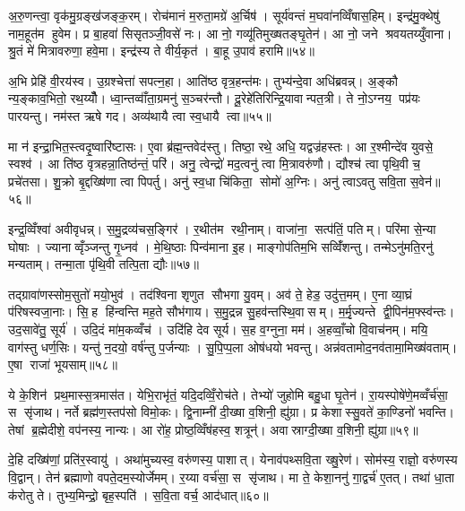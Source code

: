 अ॒रु॒णन्त्वा॒ वृक॑मु॒ग्रङ्ख॑जङ्क॒रम्। रोच॑मानं म॒रुता॒मग्रे॑ अ॒र्चिष॑। सूर्य॑वन्तं म॒घवा॑नव्विँषास॒हिम्। इन्द्र॑मु॒क्थेषु॑ नाम॒हूत॑म हुवेम। प्र बा॒हवा॑ सिसृतञ्जी॒वसे॑ नः। आ नो॒ गव्यू॑तिमुख्षतङ्घृ॒तेन॑। आ नो॒ जने श्रवयतय्युँवाना। श्रु॒तं मे॑ मित्रावरुणा॒ हवे॒मा। इन्द्र॑स्य ते वीर्य॒कृत॑। बा॒हू उ॒पाव॑ हरामि॥५४॥\anuvakamend[ब॒भू॒वाव्य॑य॒त्तेने॒मम॑ग्न इ॒ह वर्च॑सा॒ सम॑ङ्ग्धि॒ वैया॒घ्रेऽधि॑ राष्ट्र॒वर्ध॑न॒पाङ्क्ते॑न॒ छन्द॑सो॒पाव॑हरामि]

अ॒भि प्रेहि॑ वी॒रय॑स्व। उ॒ग्रश्चेत्ता॑ सपत्न॒हा। आति॑ष्ठ वृत्र॒हन्त॑मः। तुभ्य॑न्दे॒वा अधि॑ब्रवन्न्। अ॒ङ्कौ न्य॒ङ्काव॒भितो॒ रथ॒य्यौँ। ध्वा॒न्तव्वाँ॑ता॒ग्रमनु॑ स॒ञ्चर॑न्तौ। दू॒रेहे॑तिरिन्द्रि॒यावान्पत॒त्री। ते नो॒ऽग्नय॒ पप्र॑यः पारयन्तु। नम॑स्त ऋषे गद। अव्य॑थायै त्वा स्व॒धायै त्वा॥५५॥

मा न॑ इन्द्रा॒भित॒स्त्वदृ॒ष्वारि॑ष्टासः। ए॒वा ब्र॑ह्म॒न्तवेद॑स्तु। तिष्ठा॒ रथे॒ अधि॒ यद्वज्र॑हस्तः। आ र॒श्मीन्दे॑व युवसे॒ स्वश्व॑। आ ति॑ष्ठ वृत्रहन्ना॒तिष्ठ॑न्तं॒ परि॑। अनु॒ त्वेन्द्रो॑ मद॒त्वनु॑ त्वा मि॒त्रावरु॑णौ। द्यौश्च॑ त्वा पृथि॒वी च॒ प्रचे॑तसा। शु॒क्रो बृ॒द्दख्षि॑णा त्वा पिपर्तु। अनु॑ स्व॒धा चि॑किता॒ सोमो॑ अ॒ग्निः। अनु॑ त्वाऽवतु सवि॒ता स॒वेन॑॥५६॥

इन्द्र॒व्विँश्वा॑ अवीवृधन्न्। स॒मु॒द्रव्य॑चस॒ङ्गिर॑। र॒थीत॑म रथी॒नाम्। वाजा॑ना॒ सत्प॑तिं॒ पतिम्। परि॑मा से॒न्या घोषाः। ज्यानाव्वृँञ्जन्तु गृ॒ध्नव॑। मे॒थि॒ष्ठाः पिन्व॑माना इ॒ह। माङ्गोप॑तिम॒भि सव्विँ॑शन्तु। तन्मेऽनु॑मति॒रनु॑ मन्यताम्। तन्मा॒ता पृ॑थि॒वी तत्पि॒ता द्यौः॥५७॥

तद्ग्रावा॑णस्सोम॒सुतो॑ मयो॒भुव॑। तद॑श्विना शृणुत सौभगा यु॒वम्। अव॑ ते॒ हेड॒ उदु॑त्त॒मम्। ए॒ना व्या॒घ्रं प॑रिषस्वजा॒नाः। सि॒ह हि॑न्वन्ति मह॒ते सौभ॑गाय। स॒मु॒द्रन्न सु॒हव॑न्तस्थि॒वासम्। म॒र्मृ॒ज्यन्ते द्वी॒पिन॑म॒फ्स्व॑न्तः। उद॒सावे॑तु॒ सूर्य॑। उदि॒दं मा॑म॒कव्वँच॑। उदि॑हि देव सूर्य। स॒ह व॒ग्नुना॒ मम॑। अ॒हव्वाँ॒चो वि॒वाच॑नम्। मयि॒ वाग॑स्तु धर्ण॒सिः। यन्तु॑ न॒दयो॒ वर्\mbox{}ष॑न्तु प॒र्जन्याः। सु॒पि॒प्प॒ला ओष॑धयो भवन्तु। अन्न॑वतामोद॒नव॑तामा॒मिख्ष॑वताम्। ए॒षा राजा॑ भूयसाम्॥५८॥\anuvakamend[स्व॒धायै त्वा स॒वेन॒ द्यौस्सूर्य स॒प्त च॑]

ये के॒शिन॑ प्रथ॒मास्स॒त्रमास॑त। येभि॒राभृ॑तं॒ यदि॒दव्विँ॒रोच॑ते। तेभ्यो॑ जुहोमि बहु॒धा घृ॒तेन॑। रा॒यस्पोषे॑णे॒मव्वँर्च॑सा॒ स सृ॑जाथ। नर्ते ब्रह्म॑ण॒स्तप॑सो विमो॒कः। द्वि॒नाम्नी॑ दी॒ख्षा व॒शिनी॒ ह्यु॑ग्रा। प्र केशास्सु॒वते॑ का॒ण्डिनो॑ भवन्ति। तेषां ब्र॒ह्मेदीशे॒ वप॑नस्य॒ नान्यः। आ रो॑ह॒ प्रोष्ठ॒व्विँष॑हस्व॒ शत्रून्॑। अवास्राग्दी॒ख्षा व॒शिनी॒ ह्यु॑ग्रा॥५९॥

दे॒हि दख्षि॑णां॒ प्रति॑र॒स्वायु॑। अथा॑मुच्यस्व॒ वरु॑णस्य॒ पाशात्। येनाव॑पथ्सवि॒ता ख्षु॒रेण॑। सोम॑स्य॒ राज्ञो॒ वरु॑णस्य वि॒द्वान्। तेन॑ ब्रह्माणो वपते॒दम॒स्योर्जेमम्। र॒य्या वर्च॑सा॒ स सृ॑जाथ। मा ते॒ केशा॒ननु॑ गा॒द्वर्च॑ ए॒तत्। तथा॑ धा॒ता क॑रोतु ते। तुभ्य॒मिन्द्रो॒ बृह॒स्पति॑। स॒वि॒ता वर्च॒ आद॑धात्॥६०॥

